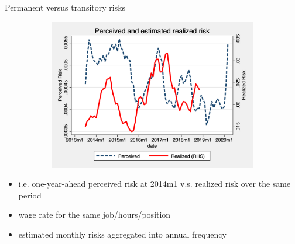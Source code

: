 \documentclass{beamer}
\begin{document}
\begin{frame}{Permanent versus transitory risks}
\begin{figure}[ht]
\begin{subfigure}[b]{0.32\textwidth}
		\includegraphics[width=\textwidth]{figures/real_volatility_compare.png}
	\end{subfigure} 
	\end{figure}
	\begin{itemize}
		\item i.e. one-year-ahead perceived risk at 2014m1 v.s. realized risk over the same period
		\item wage rate for the same job/hours/position
		\item estimated monthly risks aggregated into annual frequency 
	\end{itemize}
\hyperlink{appendix:monthly_inequality_vol}{} 
\end{frame}
\end{document}
